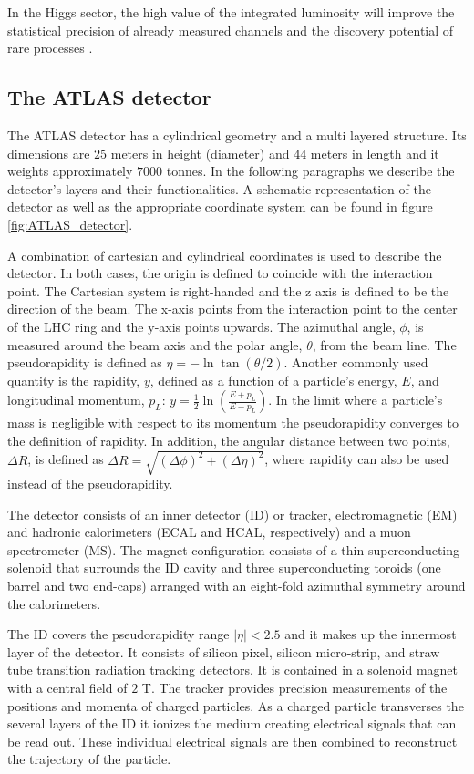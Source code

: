 In the Higgs sector, the high value of the integrated luminosity will improve the statistical precision of already measured channels and the discovery potential of rare processes \cite{HL_LHC}.

\subsection{The ATLAS detector}
\label{section:ATLAS}

The ATLAS detector has a cylindrical geometry and a multi layered structure. Its dimensions are $25$ meters in height (diameter) and $44$ meters in length and it weights approximately $7000$ tonnes. In the following paragraphs we describe the detector's layers and their functionalities. A schematic representation of the detector as well as the appropriate coordinate system can be found in figure \ref{fig:ATLAS_detector}.

A combination of cartesian and cylindrical coordinates is used to describe the detector. In both cases, the origin is defined to coincide with the interaction point. The Cartesian system is right-handed and the z axis is defined to be the direction of the beam. The x-axis points from the interaction point to the center of the LHC ring and the y-axis points upwards. The azimuthal angle, $\phi$, is measured around the beam axis and the polar angle, $\theta$, from the beam line. The pseudorapidity is defined as $\eta=-\ln \tan(\theta/2)$. Another commonly used quantity is the rapidity, $y$, defined as a function of a particle's energy, $E$, and longitudinal momentum, $p_L$: $y=\frac{1}{2}\ln \left(\frac{E+p_L}{E-p_L}\right)$. In the limit where a particle's mass is negligible with respect to its momentum the pseudorapidity converges to the definition of rapidity. In addition, the angular distance between two points, $\Delta R$, is defined as $\Delta R=\sqrt{(\Delta \phi)^2+(\Delta \eta)^2}$, where rapidity can also be used instead of the pseudorapidity. 

The detector consists of an inner detector (ID) or tracker, electromagnetic (EM) and hadronic calorimeters (ECAL and HCAL, respectively) and a muon spectrometer (MS).
The magnet configuration consists of a thin superconducting solenoid that surrounds the ID cavity and three superconducting toroids (one barrel and two end-caps) arranged with an eight-fold azimuthal symmetry around the calorimeters.

The ID covers the pseudorapidity range $|\eta|<2.5$ and it makes up the innermost layer of the detector. It consists of silicon pixel, silicon micro-strip, and straw tube transition radiation tracking detectors. It is contained in a solenoid magnet with a central field of $2$ T. The tracker provides precision measurements of the positions and momenta of charged particles. As a charged particle transverses the several layers of the ID it ionizes the medium creating electrical signals that can be read out. These individual electrical signals are then combined to reconstruct the trajectory of the particle. 

